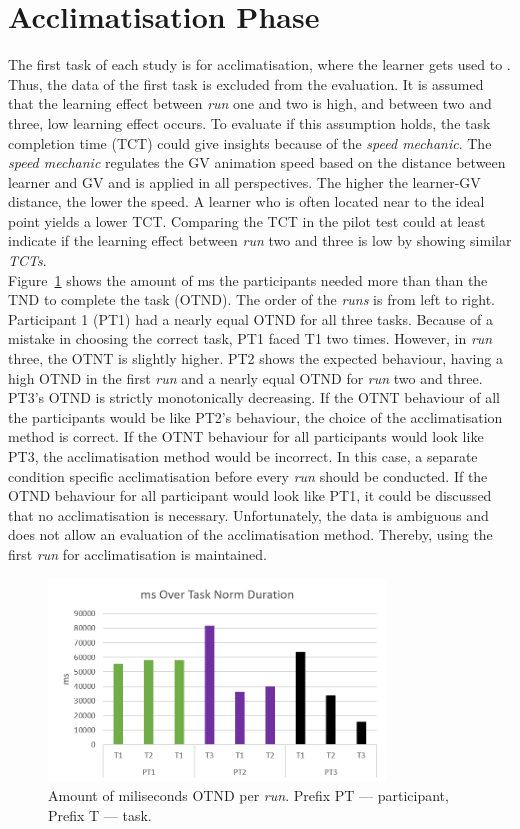 \section{Acclimatisation Phase}
\label{sec:evalAccl}
The first task of each study is for acclimatisation, where the learner gets used to \exgo. Thus, the data of the first task is excluded from the evaluation. It is assumed that the learning effect between \textit{run} one and two is high, and between two and three, low learning effect occurs. To evaluate if this assumption holds, the task completion time (TCT) could give insights because of the \textit{speed mechanic}. The \textit{speed mechanic} regulates the GV animation speed based on the distance between learner and GV and is applied in all perspectives. The higher the learner-GV distance, the lower the speed. A learner who is often located near to the ideal point yields a lower TCT. Comparing the TCT in the pilot test could at least indicate if the learning effect between \textit{run} two and three is low by showing similar \textit{TCTs}.\\
Figure~\ref{fig:tct} shows the amount of ms the participants needed more than than the TND to complete the task (OTND). The order of the \textit{runs} is from left to right. Participant 1 (PT1) had a nearly equal OTND for all three tasks. Because of a mistake in choosing the correct task, PT1 faced T1 two times. However, in \textit{run} three, the OTNT is slightly higher. PT2 shows the expected behaviour, having a high OTND in the first \textit{run} and a nearly equal OTND for \textit{run} two and three. PT3's OTND is strictly monotonically decreasing. If the OTNT behaviour of all the participants would be like PT2's behaviour, the choice of the acclimatisation method is correct. If the OTNT behaviour for all participants would look like PT3, the acclimatisation method would be incorrect. In this case, a separate condition specific acclimatisation before every \textit{run} should be conducted. If the OTND behaviour for all participant would look like PT1, it could be discussed that no acclimatisation is necessary. Unfortunately, the data is ambiguous and does not allow an evaluation of the acclimatisation method. Thereby, using the first \textit{run} for acclimatisation is maintained.

\begin{figure}[htb]
	\centering
	\includegraphics[width=0.8\textwidth]{figures/msOverTaskNorm.png}
	\caption[OTND of all \textit{runs}]{Amount of miliseconds OTND per \textit{run}. Prefix PT --- participant, Prefix T --- task.}
	\label{fig:tct}
\end{figure}


